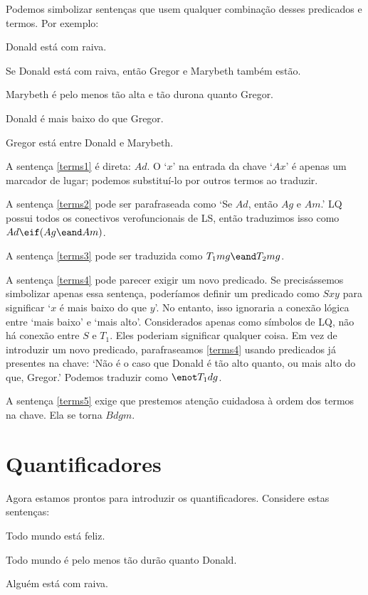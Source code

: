Podemos simbolizar sentenças que usem qualquer combinação desses predicados e termos. Por exemplo:
\begin{earg}
\item[\ex{terms1}] Donald está com raiva.
\item[\ex{terms2}] Se Donald está com raiva, então Gregor e Marybeth também estão.
\item[\ex{terms3}] Marybeth é pelo menos tão alta e tão durona quanto Gregor.
\item[\ex{terms4}] Donald é mais baixo do que Gregor.
\item[\ex{terms5}] Gregor está entre Donald e Marybeth.
\end{earg}

A sentença \ref{terms1} é direta: $Ad$. O `$x$' na entrada da chave `$Ax$' é apenas um marcador de lugar; podemos substituí-lo por outros termos ao traduzir.

A sentença \ref{terms2} pode ser parafraseada como `Se $Ad$, então $Ag$ e $Am$.' LQ possui todos os conectivos verofuncionais de LS, então traduzimos isso como $Ad \eif (Ag \eand Am)$.

A sentença \ref{terms3} pode ser traduzida como $T_1mg \eand T_2mg$.

A sentença \ref{terms4} pode parecer exigir um novo predicado. Se precisássemos simbolizar apenas essa sentença, poderíamos definir um predicado como $Sxy$ para significar `$x$ é mais baixo do que $y$'. No entanto, isso ignoraria a conexão lógica entre `mais baixo' e `mais alto'. Considerados apenas como símbolos de LQ, não há conexão entre $S$ e $T_1$. Eles poderiam significar qualquer coisa. Em vez de introduzir um novo predicado, parafraseamos \ref{terms4} usando predicados já presentes na chave: `Não é o caso que Donald é tão alto quanto, ou mais alto do que, Gregor.' Podemos traduzir como $\enot T_1dg$.

A sentença \ref{terms5} exige que prestemos atenção cuidadosa à ordem dos termos na chave. Ela se torna $Bdgm$.


\section{Quantificadores}
Agora estamos prontos para introduzir os quantificadores. Considere estas sentenças:
\begin{earg}
\item[\ex{q.a}] Todo mundo está feliz.
\item[\ex{q.ac}] Todo mundo é pelo menos tão durão quanto Donald.
\item[\ex{q.e}] Alguém está com raiva.
\end{earg}

